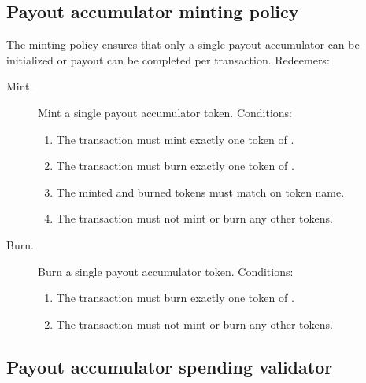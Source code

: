 \documentclass[../midgard.tex]{subfiles}
\begin{document}
\subsection{Payout accumulator minting policy}%
\label{h:payout-accumulator-minting-policy}%

The  minting policy ensures that only a single payout accumulator can be initialized or payout can be completed per transaction.
Redeemers:
\begin{description}
  \item[Mint.] Mint a single payout accumulator token.
    Conditions:
    \begin{enumerate}
      \item The transaction must mint exactly one token of .
      \item The transaction must burn exactly one token of .
      \item The minted and burned tokens must match on token name.
      \item The transaction must not mint or burn any other tokens.
    \end{enumerate}
  \item[Burn.] Burn a single payout accumulator token.
    Conditions:
    \begin{enumerate}
      \item The transaction must burn exactly one token of .
      \item The transaction must not mint or burn any other tokens.
    \end{enumerate}
\end{description}

\subsection{Payout accumulator spending validator}%
\label{h:ref}%
\end{document}
